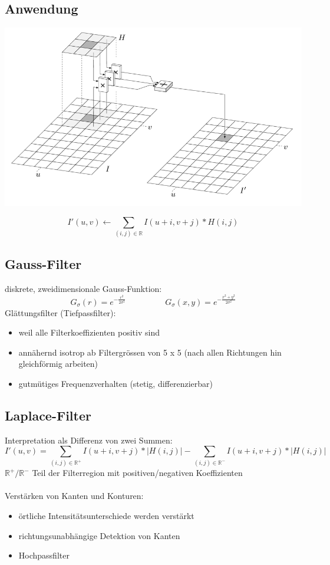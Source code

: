 \documentclass[10pt]{article}
\newcommand{\RN}{\mathbb{R}} %
\begin{document}
\subsection{Anwendung}
\begin{center}
	\includegraphics[scale=0.3]{filter-anwendung.png}
\end{center}
\begin{equation*}
	I'(u,v) \leftarrow \sum_{(i,j)\in \RN} I(u+ i, v+j) * H(i,j)
\end{equation*}

\subsection{Gauss-Filter}
diskrete, zweidimensionale Gauss-Funktion:
\begin{equation*}
	G_\sigma(r) = e^{-\frac{r^2}{2\sigma^2}} \hspace{2cm} G_\sigma(x, y) = e^{-\frac{x^2+y^2}{2\sigma^2}}
\end{equation*}
Glättungsfilter (Tiefpassfilter):
\begin{itemize}
	\item weil alle Filterkoeffizienten positiv sind
	\item annähernd isotrop ab Filtergrössen von 5 x 5 (nach allen Richtungen hin gleichförmig arbeiten)
	\item gutmütiges Frequenzverhalten (stetig, differenzierbar)
\end{itemize}

\subsection{Laplace-Filter}
Interpretation als Differenz von zwei Summen:
\begin{equation*}
	I'(u,v) = \sum_{(i,j)\in \RN^+} I(u+i,v+j)*|H(i,j)| - \sum_{(i,j)\in \RN^-} I(u+i,v+j)*|H(i,j)|
\end{equation*}
$\RN^+/\RN^-$ Teil der Filterregion mit positiven/negativen Koeffizienten \\
\\
Verstärken von Kanten und Konturen:
\begin{itemize}
	\item örtliche Intensitätsunterschiede werden verstärkt
	\item richtungsunabhängige Detektion von Kanten
	\item Hochpassfilter
\end{itemize}
\end{document}
